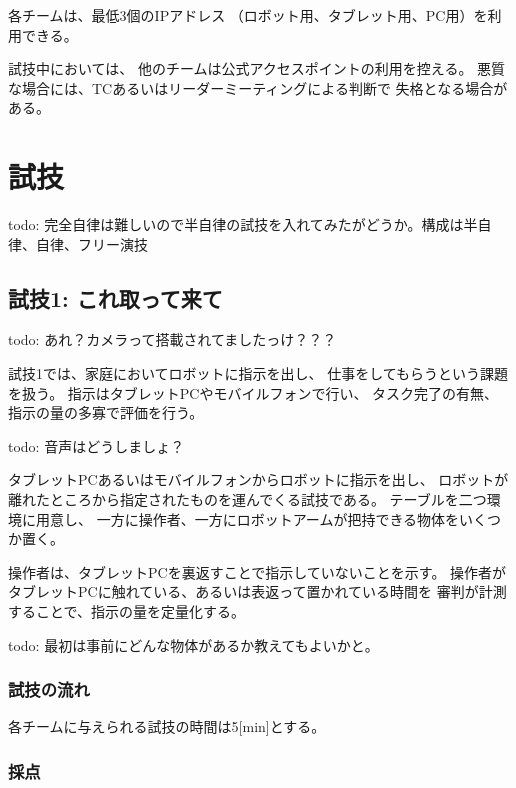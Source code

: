 \documentclass[a4j]{jarticle}
\begin{document}
各チームは、最低3個のIPアドレス
（ロボット用、タブレット用、PC用）を利用できる。

試技中においては、
他のチームは公式アクセスポイントの利用を控える。
悪質な場合には、TCあるいはリーダーミーティングによる判断で
失格となる場合がある。

\section{試技}

todo: 完全自律は難しいので半自律の試技を入れてみたがどうか。構成は半自律、自律、フリー演技

\subsection{試技1: これ取って来て}

todo: あれ？カメラって搭載されてましたっけ？？？

試技1では、家庭においてロボットに指示を出し、
仕事をしてもらうという課題を扱う。
指示はタブレットPCやモバイルフォンで行い、
タスク完了の有無、指示の量の多寡で評価を行う。

todo: 音声はどうしましょ？

タブレットPCあるいはモバイルフォンからロボットに指示を出し、
ロボットが離れたところから指定されたものを運んでくる試技である。
テーブルを二つ環境に用意し、
一方に操作者、一方にロボットアームが把持できる物体をいくつか置く。


操作者は、タブレットPCを裏返すことで指示していないことを示す。
操作者がタブレットPCに触れている、あるいは表返って置かれている時間を
審判が計測することで、指示の量を定量化する。

todo: 最初は事前にどんな物体があるか教えてもよいかと。

\subsubsection{試技の流れ}

各チームに与えられる試技の時間は5[min]とする。

\subsubsection{採点}
\end{document}
